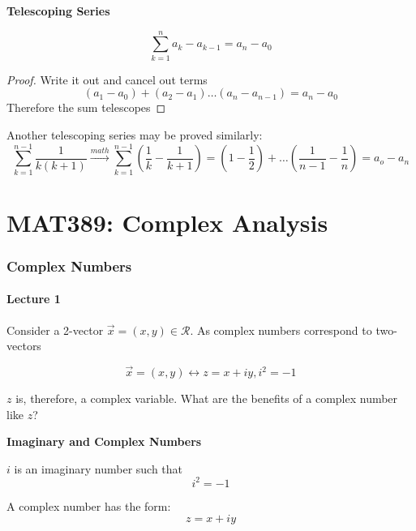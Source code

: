 \documentclass[10pt]{article}
\begin{document}
\textbf{Telescoping Series} 

\begin{equation}
	\sum_{k=1}^{n} a_k - a_{k-1} = a_n - a_0
\end{equation}

\begin{proof}
	Write it out and cancel out terms
	\begin{equation}
		(a_1 - a_0) + (a_2 - a_1) \ldots (a_n - a_{n-1}) = a_n - a_0
	\end{equation}
	Therefore the sum telescopes
\end{proof}


Another telescoping series may be proved similarly:
\begin{equation}
	\sum^{n-1}_{k=1} \frac{1}{k(k+1)} \xrightarrow{math} \sum^{n-1}_{k=1} (\frac{1}{k} - \frac{1}{k+1}) 
	= 
	(1- \frac{1}{2}) + \ldots (\frac{1}{n-1} - \frac{1}{n}) = a_o - a_n
\end{equation}






\part{MAT389: Complex Analysis}

\section{Complex Numbers}
\subsection{Lecture 1}

Consider a 2-vector $ \vec{x} = (x, y) \in \mathcal{R} $. 
As complex numbers correspond to two-vectors 

\begin{equation}
	\vec{x} = (x, y) \leftrightarrow z = x + iy, i^2 = -1
\end{equation}

$ z $ is, therefore, a complex variable. What are the benefits of a complex number like $ z $?


\begin{definition}

	\textbf{Imaginary and Complex Numbers} 

	$ i $ is an imaginary number such that
	\begin{equation}
		i^2 = -1
		\label{eq:389:i}
	\end{equation}

	A complex number has the form:
	\begin{equation}
		z = x + iy
		\label{eq:389:complex}
	\end{equation}
\end{definition}
\end{document}
